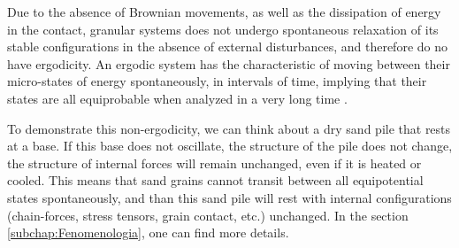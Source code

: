 
    Due to the absence of Brownian movements, as well as the dissipation of energy in the contact, granular systems does not undergo spontaneous relaxation of its stable configurations in the absence of external disturbances, and therefore do no have ergodicity. An ergodic system has the characteristic of moving between their micro-states of energy spontaneously, in intervals of time, implying that their states are all equiprobable when analyzed in a very long time \cite{Unifying_Concepts_in_Granular_Media_and_Glasses, Srdjan-Tese}.

    To demonstrate this non-ergodicity, we can think about a dry sand pile that rests at a base. If this base does not oscillate, the structure of the pile does not change, the structure of internal forces will remain unchanged, even if it is heated or cooled. This means that sand grains cannot transit between all equipotential states spontaneously, and than this sand pile will rest with internal configurations (chain-forces, stress tensors, grain contact, etc.) unchanged. In the section \ref{subchap:Fenomenologia}, one can find more details.


